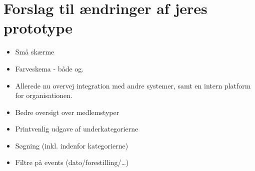 \section{Forslag til ændringer af jeres prototype}

\begin{itemize}
\item Små skærme
\item Farveskema - både og.
\item Allerede nu overvej integration med andre systemer, samt en intern
platform for organisationen.
\item Bedre oversigt over medlemstyper
\item Printvenlig udgave af underkategorierne
\item Søgning (inkl. indenfor kategorierne)
\item Filtre på events (dato/forestilling/\ldots)
\end{itemize}
